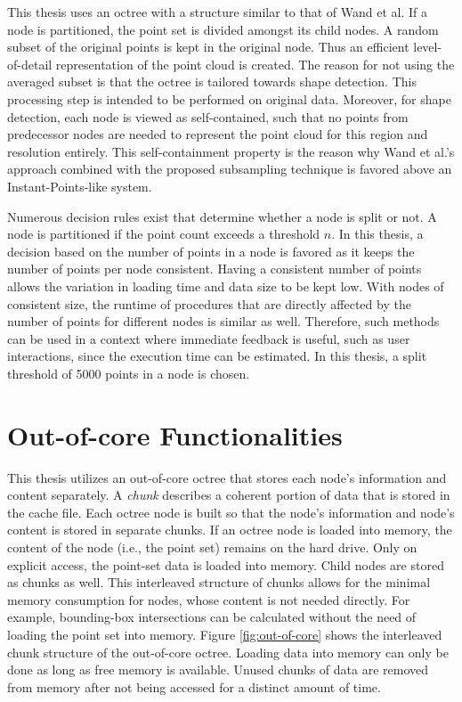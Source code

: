 This thesis uses an octree with a structure similar to that of Wand et al. If a node is partitioned, the point set is divided amongst its child nodes. A random subset of the original points is kept in the original node. Thus an efficient level-of-detail representation of the point cloud is created. 
The reason for not using the averaged subset is that the octree is tailored towards shape detection. This processing step is intended to be performed on original data. Moreover, for shape detection, each node is viewed as self-contained, such that no points from predecessor nodes are needed to represent the point cloud for this region and resolution entirely. This self-containment property is the reason why Wand et al.'s approach combined with the proposed subsampling technique is favored above an Instant-Points-like system. 

\par

Numerous decision rules exist that determine whether a node is split or not. A node is partitioned if the point count exceeds a threshold $n$. In this thesis, a decision based on the number of points in a node is favored as it keeps the number of points per node consistent.
Having a consistent number of points allows the variation in loading time and data size to be kept low. With nodes of consistent size, the runtime of procedures that are directly affected by the number of points for different nodes is similar as well. Therefore, such methods can be used in a context where immediate feedback is useful, such as user interactions, since the execution time can be estimated. In this thesis, a split threshold of 5000 points in a node is chosen. 


\section{Out-of-core Functionalities}
\label{sec:octree_ooc}
This thesis utilizes an out-of-core octree that stores each node's information and content separately. A \textit{chunk} describes a coherent portion of data that is stored in the cache file. Each octree node is built so that the node's information and node's content is stored in separate chunks. If an octree node is loaded into memory, the content of the node (i.e., the point set) remains on the hard drive. Only on explicit access, the point-set data is loaded into memory. Child nodes are stored as chunks as well. This interleaved structure of chunks allows for the minimal memory consumption for nodes, whose content is not needed directly. For example, bounding-box intersections can be calculated without the need of loading the point set into memory. Figure \ref{fig:out-of-core} shows the interleaved chunk structure of the out-of-core octree. Loading data into memory can only be done as long as free memory is available. Unused chunks of data are removed from memory after not being accessed for a distinct amount of time.

